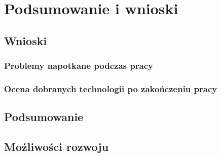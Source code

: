 \chapter{Podsumowanie i wnioski}

\section{Wnioski}

\subsection{Problemy napotkane podczas pracy}

\subsection{Ocena dobranych technologii po zakończeniu pracy}

\section{Podsumowanie}

\section{Możliwości rozwoju}

